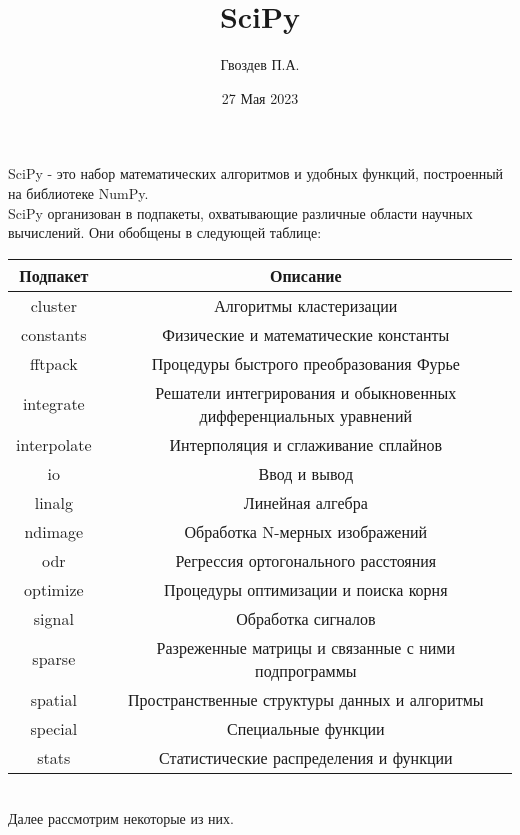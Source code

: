 \documentclass{article}
\author{Гвоздев П.А.}
\title{SciPy}
\date{27 Мая 2023}
\begin{document}
\maketitle
\newpage
SciPy - это набор математических алгоритмов и удобных функций, построенный на библиотеке NumPy.\\
SciPy организован в подпакеты, охватывающие различные области научных вычислений. Они обобщены в следующей таблице:
\\
\begin{center}
\begin{tabular}{ |c|c| } 
 \hline
 \textbf{Подпакет} & \textbf{Описание}  \\
 \hline
 \hline
 cluster & Алгоритмы кластеризации  \\ 
  \hline
 constants & Физические и математические константы  \\ 
  \hline
 fftpack &  Процедуры быстрого преобразования Фурье \\ 
  \hline
 integrate & Решатели интегрирования и обыкновенных дифференциальных уравнений  \\ 
  \hline
 interpolate & Интерполяция и сглаживание сплайнов  \\ 
  \hline
 io & Ввод и вывод  \\ 
  \hline
 linalg & Линейная алгебра \\ 
  \hline
 ndimage & Обработка N-мерных изображений \\ 
  \hline
 odr & Регрессия ортогонального расстояния  \\ 
  \hline
 optimize & Процедуры оптимизации и поиска корня  \\ 
  \hline
 signal & Обработка сигналов  \\ 
  \hline
 sparse & Разреженные матрицы и связанные с ними подпрограммы  \\ 
  \hline
 spatial & Пространственные структуры данных и алгоритмы  \\ 
  \hline
 special & Специальные функции  \\ 
  \hline
 stats & Статистические распределения и функции \\ 
 \hline
\end{tabular}
\end{center}
\\
Далее рассмотрим некоторые из них.
\end{document}
